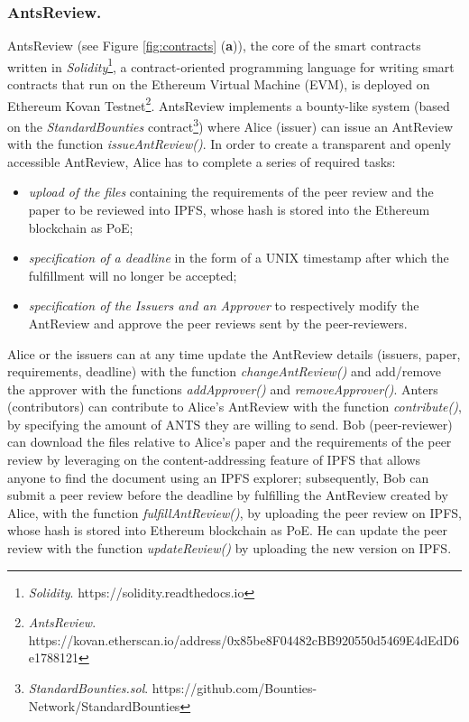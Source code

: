\documentclass[runningheads]{llncs}
\begin{document}
\subsubsection{AntsReview.}
AntsReview (see Figure \ref{fig:contracts} (\textbf{a})), the core of the smart contracts written in \emph{Solidity}\footnote[7]{\emph{Solidity}. https://solidity.readthedocs.io}, a contract-oriented programming language for writing smart contracts that run on the Ethereum Virtual Machine (EVM), is deployed on Ethereum Kovan Testnet\footnote[8]{\emph{AntsReview}. \newline https://kovan.etherscan.io/address/0x85be8F04482cBB920550d5469E4dEdD6e1788121}. AntsReview implements a bounty-like system (based on the \emph{StandardBounties} contract\footnote[9]{\emph{StandardBounties.sol}. https://github.com/Bounties-Network/StandardBounties}) where Alice (issuer) can issue an AntReview with the function \emph{issueAntReview()}.
\newline In order to create a transparent and openly accessible AntReview, Alice has to complete a series of required tasks:
 \begin{itemize}
     \item \emph{upload of the files} containing the requirements of the peer review and the paper to be reviewed into IPFS, whose hash is stored into the Ethereum blockchain as PoE;
     \item \emph{specification of a deadline} in the form of a UNIX timestamp after which the fulfillment will no longer be accepted;
     \item \emph{specification of the Issuers and an Approver} to respectively modify the AntReview and approve the peer reviews sent by the peer-reviewers.
\end{itemize}
Alice or the issuers can at any time update the AntReview details (issuers, paper, requirements, deadline) with the function \emph{changeAntReview()} and add/remove the approver with the functions \emph{addApprover()} and \emph{removeApprover()}.
 Anters (contributors) can contribute to Alice's AntReview with the function \emph{contribute()}, by specifying the amount of ANTS they are willing to send. 
Bob (peer-reviewer) can download the files relative to Alice's paper and the requirements of the peer review by leveraging on the content-addressing feature of IPFS that allows anyone to find the document using an IPFS explorer; subsequently, Bob can submit a peer review before the deadline by fulfilling the AntReview created by Alice, with the function \emph{fulfillAntReview()}, by uploading the peer review on IPFS, whose hash is stored into Ethereum blockchain as PoE. He can update the peer review with the function \emph{updateReview()} by uploading the new version on IPFS. 
\end{document}
